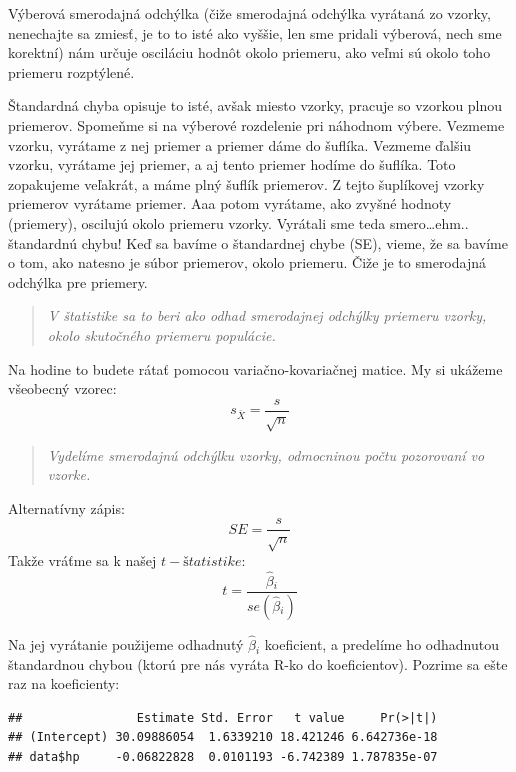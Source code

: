 Výberová smerodajná odchýlka (čiže smerodajná odchýlka vyrátaná zo
vzorky, nenechajte sa zmiesť, je to to isté ako vyššie, len sme pridali
výberová, nech sme korektní) nám určuje osciláciu hodnôt okolo priemeru,
ako veľmi sú okolo toho priemeru rozptýlené.

Štandardná chyba opisuje to isté, avšak miesto vzorky, pracuje so vzorkou
plnou priemerov. Spomeňme si na výberové rozdelenie pri náhodnom výbere.
Vezmeme vzorku, vyrátame z nej priemer a priemer dáme do šuflíka.
Vezmeme ďalšiu vzorku, vyrátame jej priemer, a aj tento priemer hodíme
do šuflíka. Toto zopakujeme veľakrát, a máme plný šuflík priemerov. Z
tejto šuplíkovej vzorky priemerov vyrátame priemer. Aaa potom vyrátame,
ako zvyšné hodnoty (priemery), oscilujú okolo priemeru vzorky. Vyrátali
sme teda smero\ldots ehm.. štandardnú chybu! Keď sa bavíme o štandardnej
chybe (SE), vieme, že sa bavíme o tom, ako natesno je súbor priemerov,
okolo priemeru. Čiže je to smerodajná odchýlka pre priemery.

\begin{quote}
\emph{V štatistike sa to beri ako odhad smerodajnej odchýlky priemeru
vzorky, okolo skutočného priemeru populácie.}
\end{quote}

Na hodine to budete rátať pomocou variačno-kovariačnej matice. My si
ukážeme všeobecný vzorec:
\[s_{\bar{X}} = \frac{s}{\sqrt{n}}\]

\begin{quote}
\emph{Vydelíme smerodajnú odchýlku vzorky, odmocninou počtu pozorovaní
vo vzorke.}
\end{quote}

Alternatívny zápis:
\[SE = \frac{s}{\sqrt{n}}\] Takže vráťme sa k našej \(t-štatistike\):
\[t = \frac{\hat\beta{}_i}{se(\hat\beta{}_i)}\]

Na jej vyrátanie použijeme odhadnutý \(\hat\beta{}_i\) koeficient, a
predelíme ho odhadnutou štandardnou chybou (ktorú pre nás vyráta R-ko do
koeficientov). Pozrime sa ešte raz na koeficienty:

\begin{Shaded}
\begin{Highlighting}[]
\OperatorTok{$}
\end{Highlighting}
\end{Shaded}

\begin{verbatim}
##                Estimate Std. Error   t value     Pr(>|t|)
## (Intercept) 30.09886054  1.6339210 18.421246 6.642736e-18
## data$hp     -0.06822828  0.0101193 -6.742389 1.787835e-07
\end{verbatim}

